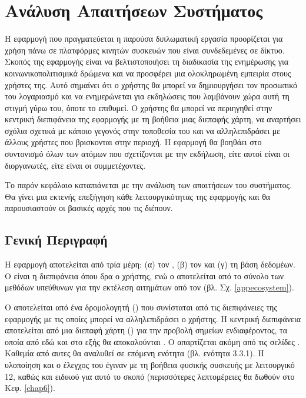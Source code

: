 \chapter{Ανάλυση Απαιτήσεων Συστήματος}
\label{chap3}

Η εφαρμογή που πραγματεύεται η παρούσα διπλωματική εργασία προορίζεται για χρήση πάνω σε πλατφόρμες κινητών συσκευών που είναι συνδεδεμένες σε δίκτυο. Σκοπός της εφαρμογής είναι να βελτιστοποιήσει τη διαδικασία της ενημέρωσης για κοινωνικοπολιτισμικά δρώμενα και να προσφέρει μια ολοκληρωμένη εμπειρία στους χρήστες της. Αυτό σημαίνει ότι ο χρήστης θα μπορεί να δημιουργήσει τον προσωπικό του λογαριασμό και να ενημερώνεται για εκδηλώσεις που λαμβάνουν χώρα αυτή τη στιγμή γύρω του, όποτε το επιθυμεί. Ο χρήστης θα μπορεί να περιηγηθεί στην κεντρική διεπιφάνεια της εφαρμογής με τη βοήθεια μιας διεπαφής χάρτη, να αναρτήσει σχόλια σχετικά με κάποιο γεγονός στην τοποθεσία του και να αλληλεπιδράσει με άλλους χρήστες που βρισκονται στην περιοχή. Η εφαρμογή θα βοηθάει στο συντονισμό όλων των ατόμων που σχετίζονται με την εκδήλωση, είτε αυτοί είναι οι διοργανωτές, είτε είναι οι συμμετέχοντες.

Το παρόν κεφάλαιο καταπιάνεται με την ανάλυση των απαιτήσεων του συστήματος. Θα γίνει μια εκτενής επεξήγηση κάθε λειτουργικότητας της εφαρμογής και θα παρουσιαστούν οι βασικές αρχές που τις διέπουν.

\section{Γενική Περιγραφή}
Η εφαρμογή αποτελείται από τρία μέρη: (α) τον , (β) τον  και (γ) τη βάση δεδομέων. Ο  είναι η διεπιφάνεια όπου δρα ο χρήστης, ενώ ο  αποτελείται από το σύνολο των μεθόδων υπεύθυνων για την εκτέλεση αιτημάτων από τον  (βλ. Σχ. \ref{appecosystem}).

Ο  αποτελείται από ένα δρομολογητή () που συνίσταται από τις διεπιφάνειες της εφαρμογής με τις οποίες μπορεί να αλληλεπιδράσει ο χρήστης. Η κεντρική διεπιφάνεια αποτελείται από μια διεπαφή χάρτη () για την προβολή σημείων ενδιαφέροντος, τα οποία από εδώ και στο εξής θα αποκαλούνται . Ο  απαρτίζεται ακόμη από τις σελίδες . Καθεμία από αυτες θα αναλυθεί σε επόμενη ενότητα (βλ. ενότητα 3.3.1). Η υλοποίηση και ο έλεγχος του  έγιναν με τη βοήθεια φυσικής συσκευής με λειτουργικό  12, καθώς και ειδικού  για αυτό το σκοπό (περισσότερες λεπτομέρειες θα δωθούν στο Κεφ. \ref{chap6}).

